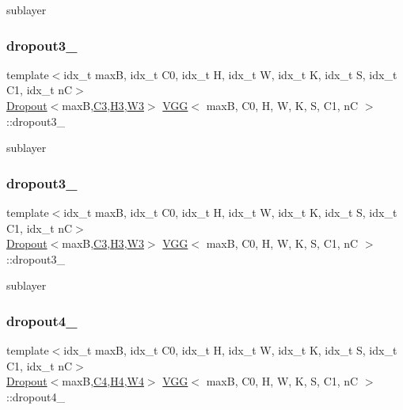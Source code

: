 sublayer \mbox{\label{structVGG_a3f8cb97bce4b3641088b8d33b151427d}} 
\subsubsection{\texorpdfstring{dropout3\+\_}{dropout3\_1}}
{\footnotesize\ttfamily template$<$idx\+\_\+t maxB, idx\+\_\+t C0, idx\+\_\+t H, idx\+\_\+t W, idx\+\_\+t K, idx\+\_\+t S, idx\+\_\+t C1, idx\+\_\+t nC$>$ \\
\hyperlink{structDropout}{Dropout}$<$maxB,\hyperlink{structVGG_a88a35c950ca73035ad75644925c05061}{C3},\hyperlink{structVGG_aad221438514d3b1a829d7f9c27a6f5ea}{H3},\hyperlink{structVGG_ad3bde49e961175621e0937584dae0af0}{W3}$>$ \hyperlink{structVGG}{V\+GG}$<$ maxB, C0, H, W, K, S, C1, nC $>$\+::dropout3\+\_}

sublayer \mbox{\label{structVGG_ae6b26b5e9a686f3ff6be6c95a56363c1}} 
\subsubsection{\texorpdfstring{dropout3\+\_}{dropout3\_2}}
{\footnotesize\ttfamily template$<$idx\+\_\+t maxB, idx\+\_\+t C0, idx\+\_\+t H, idx\+\_\+t W, idx\+\_\+t K, idx\+\_\+t S, idx\+\_\+t C1, idx\+\_\+t nC$>$ \\
\hyperlink{structDropout}{Dropout}$<$maxB,\hyperlink{structVGG_a88a35c950ca73035ad75644925c05061}{C3},\hyperlink{structVGG_aad221438514d3b1a829d7f9c27a6f5ea}{H3},\hyperlink{structVGG_ad3bde49e961175621e0937584dae0af0}{W3}$>$ \hyperlink{structVGG}{V\+GG}$<$ maxB, C0, H, W, K, S, C1, nC $>$\+::dropout3\+\_}

sublayer \mbox{\label{structVGG_ad0b64f61c99e5449686362dffcc9e5ff}} 
\subsubsection{\texorpdfstring{dropout4\+\_}{dropout4\_1}}
{\footnotesize\ttfamily template$<$idx\+\_\+t maxB, idx\+\_\+t C0, idx\+\_\+t H, idx\+\_\+t W, idx\+\_\+t K, idx\+\_\+t S, idx\+\_\+t C1, idx\+\_\+t nC$>$ \\
\hyperlink{structDropout}{Dropout}$<$maxB,\hyperlink{structVGG_a4d54a1cc3e99340dfb67e7252719c663}{C4},\hyperlink{structVGG_a1754afced5b0bbb91031179c1f58ee29}{H4},\hyperlink{structVGG_a9728cd3ccfa5011d2a795dff7e9abfe8}{W4}$>$ \hyperlink{structVGG}{V\+GG}$<$ maxB, C0, H, W, K, S, C1, nC $>$\+::dropout4\+\_}

